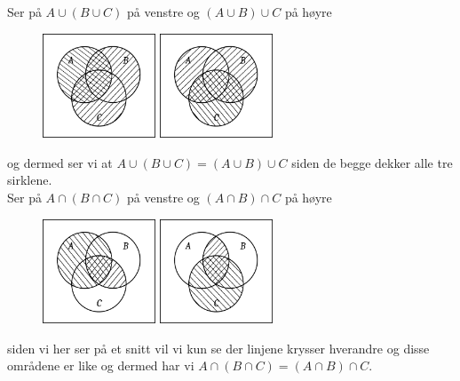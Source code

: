 \documentclass{report}
\begin{document}
Ser på $A\cup (B\cup C)$ på venstre og $(A\cup B) \cup C$ på høyre
\begin{figure}[H]
  \centering
  \includegraphics[width=0.3\textwidth]{pics/two.pdf} \;\;\;
  \includegraphics[width=0.3\textwidth]{pics/three.pdf}
\end{figure}
og dermed ser vi at $A\cup (B\cup C) = (A\cup B) \cup C$ siden de begge dekker alle tre sirklene. \\

Ser på $A\cap (B\cap C)$ på venstre og $(A\cap B) \cap C$ på høyre
\begin{figure}[H]
  \centering
  \includegraphics[width=0.3\textwidth]{pics/four.pdf} \;\;\;
  \includegraphics[width=0.3\textwidth]{pics/five.pdf}
\end{figure}
siden vi her ser på et snitt vil vi kun se der linjene krysser hverandre og disse områdene er like og dermed har vi $A\cap (B\cap C) = (A\cap B) \cap C$. \\
\end{document}

